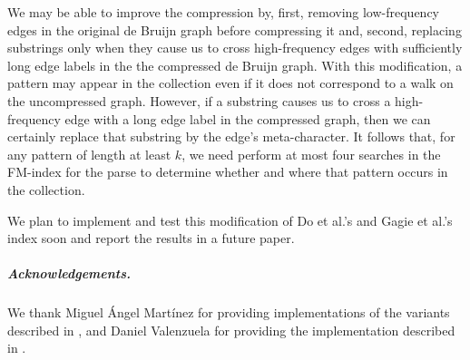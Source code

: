 \documentclass[a4paper,UKenglish]{lipics-v2016}
\begin{document}
We may be able to improve the compression by, first, removing low-frequency edges in the original de Bruijn graph before compressing it and, second, replacing substrings only when they cause us to cross high-frequency edges with sufficiently long edge labels in the the compressed de Bruijn graph.  With this modification, a pattern may appear in the collection even if it does not correspond to a walk on the uncompressed graph.  However, if a substring causes us to cross a high-frequency edge with a long edge label in the compressed graph, then we can certainly replace that substring by the edge's meta-character.  It follows that, for any pattern of length at least $k$, we need perform at most four searches in the FM-index for the parse to determine whether and where that pattern occurs in the collection.

We plan to implement and test this modification of Do et al.'s and Gagie et al.'s index soon and report the results in a future paper.



































\subparagraph*{Acknowledgements.}

We thank Miguel \'{A}ngel Mart\'{i}nez for providing implementations of the variants described in \cite{kreft2010self}, and Daniel Valenzuela for providing the implementation described in \cite{valenzuela2016chico}.
\end{document}
